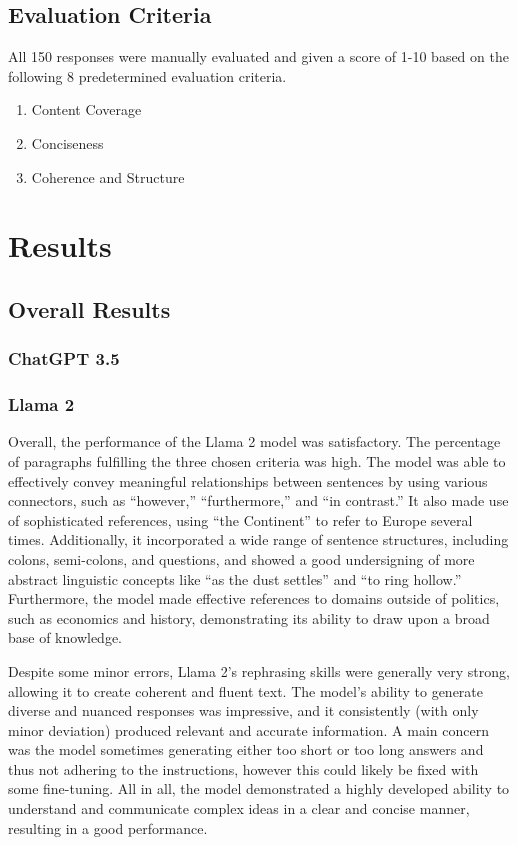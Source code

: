 \documentclass[fleqn,moreauthors,10pt]{ds_report}
\begin{document}
\subsection*{Evaluation Criteria}

All 150 responses were manually evaluated and given a score of 1-10 based on the following 8 predetermined evaluation criteria.

\begin{enumerate}
    \item Content Coverage
    \item Conciseness
    \item Coherence and Structure
\end{enumerate}


\section*{Results}

\subsection*{Overall Results}

\subsubsection*{ChatGPT 3.5}

\subsubsection*{Llama 2}
Overall, the performance of the Llama 2 model was satisfactory. The percentage of paragraphs fulfilling the three chosen criteria was high. The model was able to effectively convey meaningful relationships between sentences by using various connectors, such as “however,” “furthermore,” and “in contrast.” It also made use of sophisticated references, using “the Continent” to refer to Europe several times. Additionally, it incorporated a wide range of sentence structures, including colons, semi-colons, and questions, and showed a good undersigning of more abstract linguistic concepts like “as the dust settles” and “to ring hollow.” Furthermore, the model made effective references to domains outside of politics, such as economics and history, demonstrating its ability to draw upon a broad base of knowledge.

Despite some minor errors, Llama 2’s rephrasing skills were generally very strong, allowing it to create coherent and fluent text. The model’s ability to generate diverse and nuanced responses was impressive, and it consistently (with only minor deviation) produced relevant and accurate information. A main concern was the model sometimes generating either too short or too long answers and thus not adhering to the instructions, however this could likely be fixed with some fine-tuning. All in all, the model demonstrated a highly developed ability to understand and communicate complex ideas in a clear and concise manner, resulting in a good performance.
\end{document}
